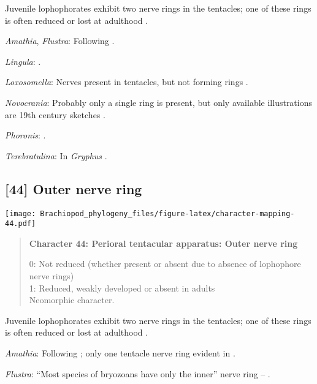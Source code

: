 \documentclass[openany]{book}
\theoremstyle{definition}
\theoremstyle{definition}
\theoremstyle{definition}
\theoremstyle{remark}
\begin{document}
Juvenile lophophorates exhibit two nerve rings in the tentacles; one of
these rings is often reduced or lost at adulthood
\citep{Temereva2017Innervationof}.

\hypertarget{Amathia-coding-43}{}
\emph{Amathia}, \emph{Flustra}: Following
\citet{Temereva2017Innervationof}.

\hypertarget{Lingula-coding-43}{}
\emph{Lingula}: \citet{Temereva2017Thefirst}.

\hypertarget{Loxosomella-coding-43}{}
\emph{Loxosomella}: Nerves present in tentacles, but not forming rings
\citep{Fuchs2006}.

\hypertarget{Novocrania-coding-43}{}
\emph{Novocrania}: Probably only a single ring is present, but only
available illustrations are 19th century sketches \citep{Luter2016}.

\hypertarget{Phoronis-coding-43}{}
\emph{Phoronis}: \citep{Temereva2017Innervationof}.

\hypertarget{Terebratulina-coding-43}{}
\emph{Terebratulina}: In \emph{Gryphus} \citep{Temereva2017Thefirst}.

\subsection*{{[}44{]} Outer nerve ring}\label{outer-nerve-ring}

\texttt{[image: Brachiopod\_phylogeny\_files/figure-latex/character-mapping-44.pdf]}

\begin{quote}
\textbf{Character 44: Perioral tentacular apparatus: Outer nerve ring}

0: Not reduced (whether present or absent due to absence of lophophore
nerve rings)\\
1: Reduced, weakly developed or absent in adults\\
Neomorphic character.
\end{quote}

Juvenile lophophorates exhibit two nerve rings in the tentacles; one of
these rings is often reduced or lost at adulthood
\citep{Temereva2017Innervationof}.

\hypertarget{Amathia-coding-44}{}
\emph{Amathia}: Following \citet{Temereva2017Innervationof}; only one
tentacle nerve ring evident in \citet{Temereva2016Thenervous}.

\hypertarget{Flustra-coding-44}{}
\emph{Flustra}: ``Most species of bryozoans have only the inner'' nerve
ring -- \citet{Temereva2017Innervationof}.
\end{document}
